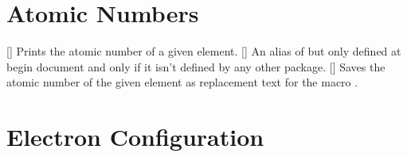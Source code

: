 \documentclass[load-preamble+]{cnltx-doc}
\begin{document}
\begin{example}
   \par
   \par
  \saveelementsymbol{}
  \ttfamily\meaning\foo
\end{example}

\section{Atomic Numbers}

\begin{commands}
  []
    Prints the atomic number of a given element.
  []
    An alias of  but only defined at begin document and only
    if it isn't defined by any other package.
  []
    Saves the atomic number of the given element as replacement text for the
    macro .
\end{commands}

\begin{example}
   \par
   \par
  \saveatomicnumber{}
  \ttfamily\meaning\foo
\end{example}

\section{Electron Configuration}
\end{document}
